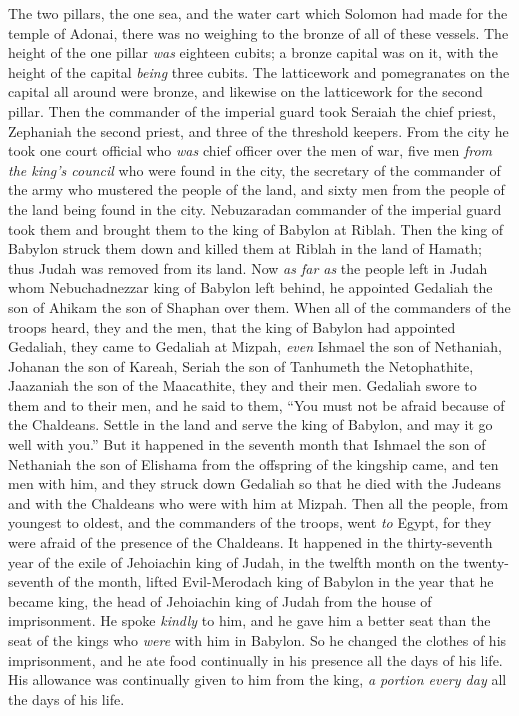 \begin{biblechapter}
\verse The two pillars, the one sea, and the water cart which Solomon had made for the temple of Adonai, there was no weighing to the bronze of all of these vessels.
\verse The height of the one pillar \textit{was} eighteen cubits; a bronze capital was on it, with the height of the capital \textit{being} three cubits. The latticework and pomegranates on the capital all around were bronze, and likewise on the latticework for the second pillar.
\verse Then the commander of the imperial guard took Seraiah the chief priest, Zephaniah the second priest, and three of the threshold keepers.
\verse From the city he took one court official who \textit{was} chief officer over the men of war, five men \textit{from the king’s council} who were found in the city, the secretary of the commander of the army who mustered the people of the land, and sixty men from the people of the land being found in the city.
\verse Nebuzaradan commander of the imperial guard took them and brought them to the king of Babylon at Riblah.
\verse Then the king of Babylon struck them down and killed them at Riblah in the land of Hamath; thus Judah was removed from its land.
 Now \textit{as far as} the people left in Judah whom Nebuchadnezzar king of Babylon left behind, he appointed Gedaliah the son of Ahikam the son of Shaphan over them.
\verse When all of the commanders of the troops heard, they and the men, that the king of Babylon had appointed Gedaliah, they came to Gedaliah at Mizpah, \textit{even} Ishmael the son of Nethaniah, Johanan the son of Kareah, Seriah the son of Tanhumeth the Netophathite, Jaazaniah the son of the Maacathite, they and their men.
\verse Gedaliah swore to them and to their men, and he said to them, “You must not be afraid because of the Chaldeans. Settle in the land and serve the king of Babylon, and may it go well with you.”
\verse But it happened in the seventh month that Ishmael the son of Nethaniah the son of Elishama from the offspring of the kingship came, and ten men with him, and they struck down Gedaliah so that he died with the Judeans and with the Chaldeans who were with him at Mizpah.
\verse Then all the people, from youngest to oldest, and the commanders of the troops, went \textit{to} Egypt, for they were afraid of the presence of the Chaldeans.
 It happened in the thirty-seventh year of the exile of Jehoiachin king of Judah, in the twelfth month on the twenty-seventh of the month, lifted Evil-Merodach king of Babylon in the year that he became king, the head of Jehoiachin king of Judah from the house of imprisonment.
\verse He spoke \textit{kindly} to him, and he gave him a better seat than the seat of the kings who \textit{were} with him in Babylon.
\verse So he changed the clothes of his imprisonment, and he ate food continually in his presence all the days of his life.
\verse His allowance was continually given to him from the king, \textit{a portion every day} all the days of his life.
\end{biblechapter}

